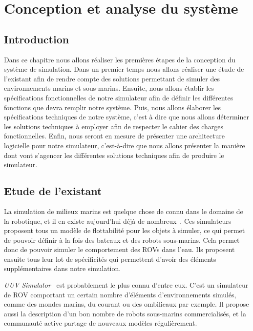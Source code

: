 \chapter{Conception et analyse du système}
\label{chapitre:systeme}

    \section{Introduction}

        Dans ce chapitre nous allons réaliser les premières étapes de la conception du système de simulation. Dans un premier temps nous allons réaliser une étude de l'existant afin de rendre compte des solutions permettant de simuler des environnements marins et sous-marins. Ensuite, nous allons établir les spécifications fonctionnelles de notre simulateur afin de définir les différentes fonctions que devra remplir notre système. Puis, nous allons élaborer les spécifications techniques de notre système, c'est à dire que nous allons déterminer les solutions techniques à employer afin de respecter le cahier des charges fonctionnelles. Enfin, nous seront en mesure de présenter une architecture logicielle pour notre simulateur, c'est-à-dire que nous allons présenter la manière dont vont s'agencer les différentes solutions techniques afin de produire le simulateur.

    \section{Etude de l'existant}

        La simulation de milieux marins est quelque chose de connu dans le domaine de la robotique, et il en existe aujourd'hui déjà de nombreux~\cite{Manhaes_2016, bingham19toward, MARS, Rock}. Ces simulateurs proposent tous un modèle de flottabilité pour les objets à simuler, ce qui permet de pouvoir définir à la fois des bateaux et des robots sous-marins. Cela permet donc de pouvoir simuler le comportement des \gls{ROV}s dans l'eau. Ils proposent ensuite tous leur lot de spécificités qui permettent d'avoir des éléments supplémentaires dans notre simulation.
        
        \textit{UUV Simulator}~\cite{Manhaes_2016} est probablement le plus connu d'entre eux. C'est un simulateur de \gls{ROV} comportant un certain nombre d'éléments d'environnements simulés, comme des mondes marins, du courant ou des ombilicaux par exemple. Il propose aussi la description d'un bon nombre de robots sous-marins commercialisés, et la communauté active partage de nouveaux modèles régulièrement.
        

